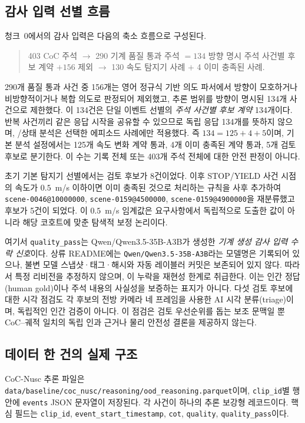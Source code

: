 \subsection{감사 입력 선별 흐름}
청크~0에서의 감사 입력은 다음의 축소 흐름으로 구성된다.
\begin{quote}
\small
403 CoC 주석 $\rightarrow$ 290 기계 품질 통과 주석 $=134$ 방향 명시 주석 사건별 후보 계약 $+156$ 제외 $\rightarrow$ 130 속도 탐지기 사례 $+$ 4 이미 충족된 사례.
\end{quote}
290개 품질 통과 사건 중 156개는 영어 정규식 기반 의도 파서에서 방향이 모호하거나 비방향적이거나 복합 의도로 판정되어 제외했고, 추론 범위를 방향이 명시된 134개 사건으로 제한했다. 이 134건은 단일 이벤트 선별의 \emph{주석 사건별 후보 계약} 134개이다. 반복 사건끼리 같은 응답 시작을 공유할 수 있으므로 독립 응답 134개를 뜻하지 않으며, \preserve/\reset 상태 분석은 선택한 에피소드 사례에만 적용했다. 즉 $134=125+4+5$이며, 기본 분석 설정에서는 125개 속도 변화 계약 통과, 4개 이미 충족된 계약 통과, 5개 검토 후보로 분기한다. 이 수는 기록 전체 또는 403개 주석 전체에 대한 안전 판정이 아니다.

초기 기본 탐지기 선별에서는 검토 후보가 8건이었다. 이후 STOP/YIELD 사건 시점의 속도가 $0.5$~m/s 이하이면 이미 충족된 것으로 처리하는 규칙을 사후 추가하여 \texttt{scene-0046@10000000}, \texttt{scene-0159@4500000}, \texttt{scene-0159@4900000}을 재분류했고 후보가 5건이 되었다. 이 $0.5$~m/s 임계값은 요구사항에서 독립적으로 도출한 값이 아니라 해당 코호트에 맞춘 탐색적 보정 논리이다.

여기서 \texttt{quality\_pass}는 Qwen/Qwen3.5-35B-A3B가 생성한 \emph{기계 생성 감사 입력 수락 신호}이다. 상류 README에는 \texttt{Qwen/Qwen3.5-35B-A3B}라는 모델명은 기록되어 있으나, 불변 모델 스냅샷·태그·해시와 자동 레이블러 커밋은 보존되어 있지 않다. 따라서 특정 리비전을 추정하지 않으며, 이 누락을 재현성 한계로 취급한다. 이는 인간 정답(human gold)이나 주석 내용의 사실성을 보증하는 표지가 아니다. 다섯 검토 후보에 대한 시각 점검도 각 후보의 전방 카메라 네 프레임을 사용한 AI 시각 분류(triage)이며, 독립적인 인간 검증이 아니다. 이 점검은 검토 우선순위를 돕는 보조 문맥일 뿐 CoC--궤적 일치의 독립 인과 근거나 물리 안전성 결론을 제공하지 않는다.

\subsection{데이터 한 건의 실제 구조}
CoC-Nusc 추론 파일은 \texttt{data/baseline/coc\_nusc/reasoning/ood\_reasoning.parquet}이며, \texttt{clip\_id}별 행 안에 \texttt{events} JSON 문자열이 저장된다. 각 사건이 하나의 추론 보강형 레코드이다. 핵심 필드는 \texttt{clip\_id}, \texttt{event\_start\_timestamp}, \texttt{cot}, \texttt{quality}, \texttt{quality\_pass}이다.


